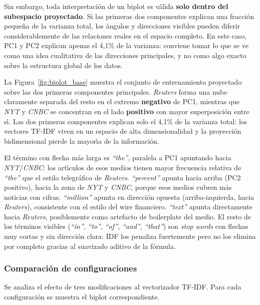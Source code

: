 \documentclass[11pt,a4paper]{article}
\begin{document}
Sin embargo, toda interpretaci\'{o}n de un biplot es v\'{a}lida \textbf{solo dentro del subespacio proyectado}. Si las primeras dos componentes explican una fracci\'{o}n peque\~{n}a de la varianza total, los \'{a}ngulos y direcciones visibles pueden diferir considerablemente de las relaciones reales en el espacio completo. En este caso, PC1 y PC2 explican apenas el 4,1\% de la varianza: conviene tomar lo que se ve como una idea cualitativa de las direcciones principales, y no como algo exacto sobre la estructura global de los datos.

La Figura~\ref{fig:biplot_base} muestra el conjunto de entrenamiento proyectado sobre las dos primeras componentes principales. \textit{Reuters} forma una nube claramente separada del resto en el extremo \textbf{negativo} de PC1, mientras que \textit{NYT} y \textit{CNBC} se concentran en el lado \textbf{positivo} con mayor superposici\'{o}n entre s\'{\i}. Las dos primeras componentes explican solo el 4,1\% de la varianza total: los vectores TF-IDF viven en un espacio de alta dimensionalidad y la proyecci\'{o}n bidimensional pierde la mayor\'{\i}a de la informaci\'{o}n.

El t\'{e}rmino con flecha m\'{a}s larga es \textit{``the''}, paralela a PC1 apuntando hacia \textit{NYT}/\textit{CNBC}: los art\'{\i}culos de esos medios tienen mayor frecuencia relativa de \textit{``the''} que el estilo telegr\'{a}fico de \textit{Reuters}. \textit{``percent''} apunta hacia arriba (PC2 positivo), hacia la zona de \textit{NYT} y \textit{CNBC}, porque esos medios cubren m\'{a}s noticias con cifras. \textit{``million''} apunta en direcci\'{o}n opuesta (arriba-izquierda, hacia \textit{Reuters}), consistente con el estilo del wire financiero. \textit{``text''} apunta directamente hacia \textit{Reuters}, posiblemente como artefacto de boilerplate del medio. El resto de los t\'{e}rminos visibles (\textit{``in''}, \textit{``to''}, \textit{``of''}, \textit{``and''}, \textit{``that''}) son \textit{stop words} con flechas muy cortas y sin direcci\'{o}n clara: IDF los penaliza fuertemente pero no los elimina por completo gracias al suavizado aditivo de la f\'{o}rmula.

\subsubsection*{Comparaci\'{o}n de configuraciones}

Se analiza el efecto de tres modificaciones al vectorizador TF-IDF. Para cada configuraci\'{o}n se muestra el biplot correspondiente.
\end{document}
